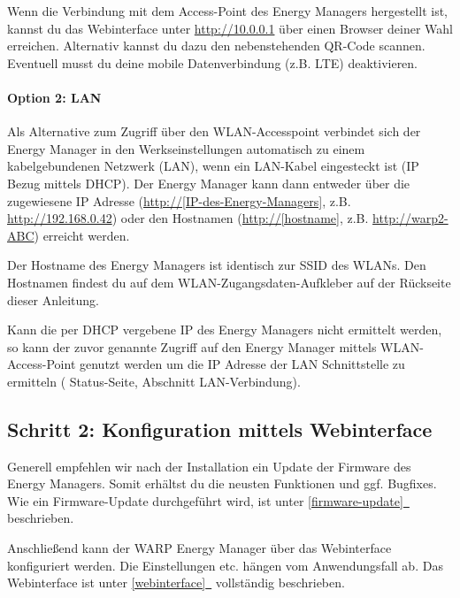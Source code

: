 \documentclass[a4paper,10pt]{article}
\newcommand*{\fullref}[1]{\hyperref[{#1}]{\ref*{#1}~\nameref*{#1}}}
\begin{document}
\begin{multicols*}{2}
	\begin{minipage}{0.35\textwidth}
		Wenn die Verbindung mit dem Access-Point des Energy Managers hergestellt ist, kannst du das Webinterface
		unter \url{http://10.0.0.1} über einen Browser deiner Wahl erreichen.
		Alternativ kannst du dazu den nebenstehenden QR-Code scannen.
		Eventuell musst du deine mobile Datenverbindung (z.B. LTE) deaktivieren.
	\end{minipage}\hfill
	\begin{minipage}{0.12\textwidth}
		\begin{flushright}
		\end{flushright}
	\end{minipage}

	\paragraph{Option 2: LAN}
	Als Alternative zum Zugriff über den WLAN-Accesspoint verbindet sich der
	Energy Manager in den Werkseinstellungen automatisch zu einem
	kabelgebundenen Netzwerk (LAN), wenn ein LAN-Kabel eingesteckt ist (IP Bezug
	mittels DHCP). Der Energy Manager kann dann entweder über die zugewiesene IP
	Adresse (\url{http://[IP-des-Energy-Managers]}, z.B. \url{http://192.168.0.42})
	oder den Hostnamen (\url{http://[hostname]}, z.B. \url{http://warp2-ABC}) erreicht werden.

	Der Hostname des Energy Managers ist identisch zur SSID des WLANs. Den Hostnamen findest du
	auf dem WLAN-Zugangsdaten-Aufkleber auf der Rückseite dieser Anleitung.

	Kann die per DHCP vergebene IP des Energy Managers nicht ermittelt werden, so kann der
	zuvor genannte Zugriff auf den Energy Manager mittels WLAN-Access-Point genutzt
	werden um die IP Adresse der LAN Schnittstelle zu ermitteln (\glqq
	Status-Seite\grqq, Abschnitt \glqq LAN-Verbindung\grqq).


	\subsection{Schritt 2: Konfiguration mittels Webinterface}
	Generell empfehlen wir nach der Installation ein Update der Firmware des
	Energy Managers. Somit erhältst du die neusten Funktionen und ggf. Bugfixes. Wie ein
	Firmware-Update durchgeführt wird, ist unter \fullref{firmware-update}
	beschrieben.

	Anschließend kann der WARP Energy Manager über das Webinterface konfiguriert
	werden. Die Einstellungen etc. hängen vom Anwendungsfall ab. 
	Das Webinterface ist unter \fullref{webinterface} vollständig beschrieben.


\end{multicols*}
\end{document}
